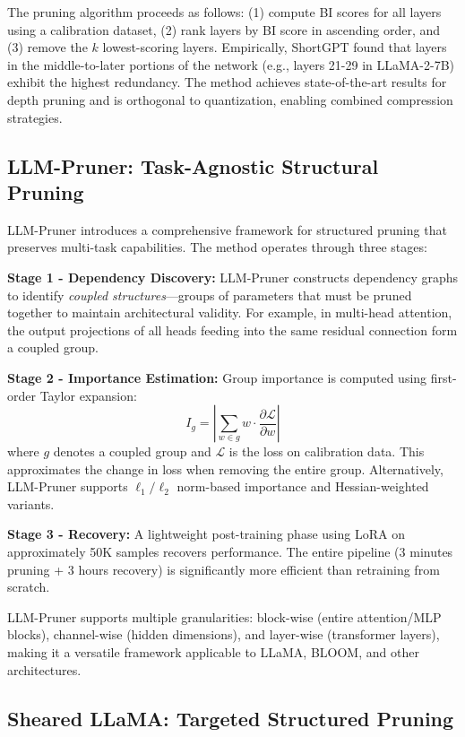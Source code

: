 \documentclass{article}
\begin{document}
The pruning algorithm proceeds as follows: (1) compute BI scores for all layers using a calibration dataset, (2) rank layers by BI score in ascending order, and (3) remove the $k$ lowest-scoring layers. Empirically, ShortGPT found that layers in the middle-to-later portions of the network (e.g., layers 21-29 in LLaMA-2-7B) exhibit the highest redundancy. The method achieves state-of-the-art results for depth pruning and is orthogonal to quantization, enabling combined compression strategies.

\subsection{LLM-Pruner: Task-Agnostic Structural Pruning}

LLM-Pruner \cite{ma2024llmpruner} introduces a comprehensive framework for structured pruning that preserves multi-task capabilities. The method operates through three stages:

\textbf{Stage 1 - Dependency Discovery:} LLM-Pruner constructs dependency graphs to identify \emph{coupled structures}---groups of parameters that must be pruned together to maintain architectural validity. For example, in multi-head attention, the output projections of all heads feeding into the same residual connection form a coupled group.

\textbf{Stage 2 - Importance Estimation:} Group importance is computed using first-order Taylor expansion:
\begin{equation}
    I_g = \left| \sum_{w \in g} w \cdot \frac{\partial \mathcal{L}}{\partial w} \right|
\end{equation}
where $g$ denotes a coupled group and $\mathcal{L}$ is the loss on calibration data. This approximates the change in loss when removing the entire group. Alternatively, LLM-Pruner supports $\ell_1/\ell_2$ norm-based importance and Hessian-weighted variants.

\textbf{Stage 3 - Recovery:} A lightweight post-training phase using LoRA \cite{hu2022lora} on approximately 50K samples recovers performance. The entire pipeline (3 minutes pruning + 3 hours recovery) is significantly more efficient than retraining from scratch.

LLM-Pruner supports multiple granularities: block-wise (entire attention/MLP blocks), channel-wise (hidden dimensions), and layer-wise (transformer layers), making it a versatile framework applicable to LLaMA, BLOOM, and other architectures.

\subsection{Sheared LLaMA: Targeted Structured Pruning}
\end{document}
